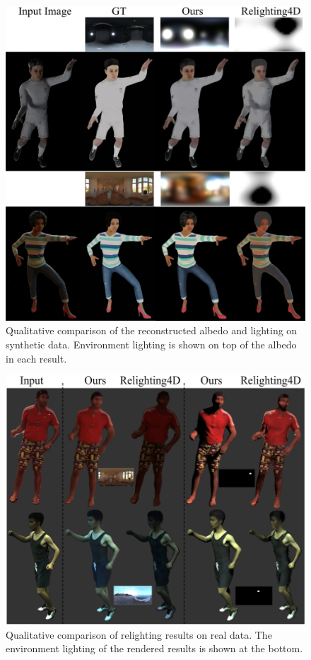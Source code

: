 \begin{figure}[t]
\begin{center}
   \includegraphics[width=1.0\linewidth]{./fig/albedo_rec.jpg}
\end{center}
\caption{Qualitative comparison of the reconstructed albedo and lighting on synthetic data. Environment lighting is shown on top of the albedo in each result.}
\label{fig:albedo_rec}
\end{figure}

\begin{figure}[t]
\begin{center}
   \includegraphics[width=1.0\linewidth]{./fig/relit_real.jpg}
\end{center}
\caption{Qualitative comparison of relighting results on real data. The environment lighting of the rendered results is shown at the bottom.}
\label{fig:relit_real}
\end{figure}
